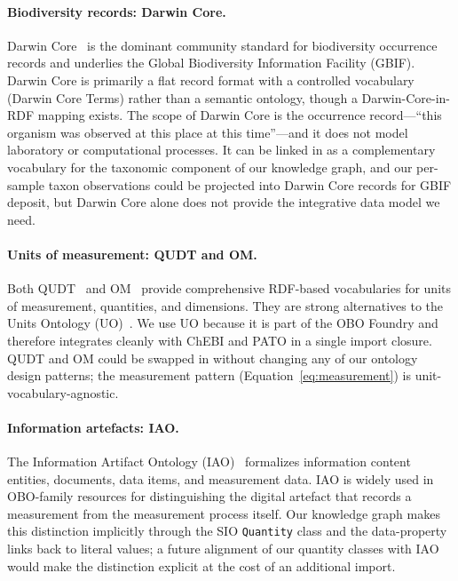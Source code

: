 \documentclass[11pt,a4paper]{article}
\begin{document}
\paragraph{Biodiversity records: Darwin Core.}
Darwin Core~\cite{darwincore} is the dominant community standard for
biodiversity occurrence records and underlies the Global
Biodiversity Information Facility (GBIF). Darwin Core is primarily
a flat record format with a controlled vocabulary (Darwin Core
Terms) rather than a semantic ontology, though a
Darwin-Core-in-RDF mapping exists. The scope of Darwin Core is the
occurrence record---``this organism was observed at this place at
this time''---and it does not model laboratory or computational
processes. It can be linked in as a complementary vocabulary for
the taxonomic component of our knowledge graph, and our per-sample
taxon observations could be projected into Darwin Core records for
GBIF deposit, but Darwin Core alone does not provide the integrative
data model we need.

\paragraph{Units of measurement: QUDT and OM.}
Both QUDT~\cite{qudt} and OM~\cite{om_ontology} provide comprehensive
RDF-based vocabularies for units of measurement, quantities, and
dimensions. They are strong alternatives to the Units Ontology
(UO)~\cite{uo}. We use UO because it is part of the OBO Foundry and
therefore integrates cleanly with ChEBI and PATO in a single
import closure. QUDT and OM could be swapped in without changing any
of our ontology design patterns; the measurement pattern
(Equation~\ref{eq:measurement}) is unit-vocabulary-agnostic.

\paragraph{Information artefacts: IAO.}
The Information Artifact Ontology (IAO)~\cite{iao} formalizes
information content entities, documents, data items, and
measurement data. IAO is widely used in OBO-family resources for
distinguishing the digital artefact that records a measurement
from the measurement process itself. Our knowledge graph makes this
distinction implicitly through the SIO \texttt{Quantity} class and
the data-property links back to literal values; a future alignment
of our quantity classes with IAO would make the distinction
explicit at the cost of an additional import.

\end{document}
